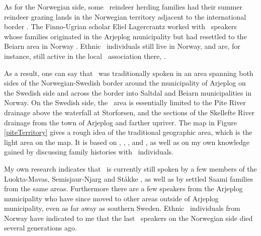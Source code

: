 As for the Norwegian side, some \PS\ reindeer herding families had their summer reindeer grazing lands in the Norwegian territory adjacent to the international border \cite[cf.][]{Manker1947}. The Finno-Ugrian scholar Eliel Lagercrantz worked with \PS\ speakers whose families originated in the Arjeplog municipality but had resettled to the Beiarn area in Norway \cite[cf.][]{Lagercrantz1926}. Ethnic \PS\ individuals still live in Norway, and are, for instance, still active in the local \PS\ association there, . 

As a result, one can say that \PS\ was traditionally spoken in an area spanning both sides of the Norwegian-Swedish border around the municipality of Arjeplog on the Swedish side and across the border into Saltdal and Beiarn municipalities in Norway. %
On the Swedish side, the \PS\ area is essentially limited to the Pite River %
drainage above the waterfall at Storforsen, and the sections of the Skellefte River %
drainage from the town of Arjeplog and farther upriver. %
The map in Figure \vref{piteTerritory} gives a rough idea of the traditional geographic area, which is the light area on the map. It is based on  \citet{Lagercrantz1926}, \citet{Ruong1943}, \citet{Manker1947}, \citet{Bergsland1962} and \citet{Sammallahti1998}, as well as on my own knowledge gained by discussing family histories with \PS\ individuals.

My own research indicates that \PS\ is currently still spoken by a few members of the Luokta-Mavas, Semisjaur-Njarg and Ståkke , as well as by settled Saami families from the same areas. Furthermore there are a few speakers from the Arjeplog municipality who have since moved to other areas outside of Arjeplog municipality, %
even as far away as southern Sweden. %
Ethnic \PS\ individuals from Norway have indicated to me that the last \PS\ speakers on the Norwegian side died several generations ago.%

